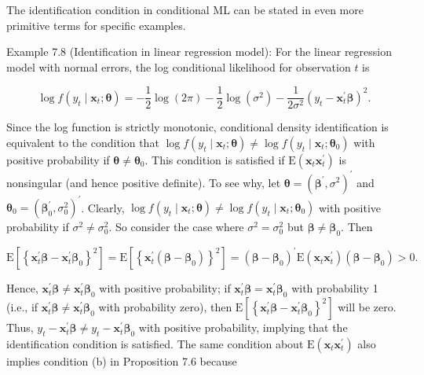 \documentclass[10pt]{article}
\begin{document}
The identification condition in conditional ML can be stated in even more primitive terms for specific examples.

Example 7.8 (Identification in linear regression model): For the linear regression model with normal errors, the log conditional likelihood for observation $t$ is

$$
\log f\left(y_{t} \mid \mathbf{x}_{t} ; \boldsymbol{\theta}\right)=-\frac{1}{2} \log (2 \pi)-\frac{1}{2} \log \left(\sigma^{2}\right)-\frac{1}{2 \sigma^{2}}\left(y_{t}-\mathbf{x}_{t}^{\prime} \boldsymbol{\beta}\right)^{2} .
$$

Since the log function is strictly monotonic, conditional density identification is equivalent to the condition that $\log f\left(y_{t} \mid \mathbf{x}_{t} ; \boldsymbol{\theta}\right) \neq \log f\left(y_{t} \mid \mathbf{x}_{t} ; \boldsymbol{\theta}_{0}\right)$ with positive probability if $\boldsymbol{\theta} \neq \boldsymbol{\theta}_{0}$. This condition is satisfied if $\mathrm{E}\left(\mathbf{x}_{t} \mathbf{x}_{t}^{\prime}\right)$ is nonsingular (and hence positive definite). To see why, let $\boldsymbol{\theta}=\left(\boldsymbol{\beta}^{\prime}, \sigma^{2}\right)^{\prime}$ and $\boldsymbol{\theta}_{0}=\left(\boldsymbol{\beta}_{0}^{\prime}, \sigma_{0}^{2}\right)^{\prime}$. Clearly, $\log f\left(y_{t} \mid \mathbf{x}_{t} ; \boldsymbol{\theta}\right) \neq \log f\left(y_{t} \mid \mathbf{x}_{t} ; \boldsymbol{\theta}_{0}\right)$ with positive probability if $\sigma^{2} \neq \sigma_{0}^{2}$. So consider the case where $\sigma^{2}=\sigma_{0}^{2}$ but $\boldsymbol{\beta} \neq \boldsymbol{\beta}_{0}$. Then

$$
\mathrm{E}\left[\left\{\mathbf{x}_{t}^{\prime} \boldsymbol{\beta}-\mathbf{x}_{t}^{\prime} \boldsymbol{\beta}_{0}\right\}^{2}\right]=\mathrm{E}\left[\left\{\mathbf{x}_{t}^{\prime}\left(\boldsymbol{\beta}-\boldsymbol{\beta}_{0}\right)\right\}^{2}\right]=\left(\boldsymbol{\beta}-\boldsymbol{\beta}_{0}\right)^{\prime} \mathrm{E}\left(\mathbf{x}_{t} \mathbf{x}_{t}^{\prime}\right)\left(\boldsymbol{\beta}-\boldsymbol{\beta}_{0}\right)>0 .
$$

Hence, $\mathbf{x}_{t}^{\prime} \boldsymbol{\beta} \neq \mathbf{x}_{t}^{\prime} \boldsymbol{\beta}_{0}$ with positive probability; if $\mathbf{x}_{t}^{\prime} \boldsymbol{\beta}=\mathbf{x}_{t}^{\prime} \boldsymbol{\beta}_{0}$ with probability 1 (i.e., if $\mathbf{x}_{t}^{\prime} \boldsymbol{\beta} \neq \mathbf{x}_{t}^{\prime} \boldsymbol{\beta}_{0}$ with probability zero), then $\mathrm{E}\left[\left\{\mathbf{x}_{t}^{\prime} \boldsymbol{\beta}-\mathbf{x}_{t}^{\prime} \boldsymbol{\beta}_{0}\right\}^{2}\right]$ will be zero. Thus, $y_{t}-\mathbf{x}_{t}^{\prime} \boldsymbol{\beta} \neq y_{t}-\mathbf{x}_{t}^{\prime} \boldsymbol{\beta}_{0}$ with positive probability, implying that the identification condition is satisfied. The same condition about $\mathrm{E}\left(\mathbf{x}_{t} \mathbf{x}_{t}^{\prime}\right)$ also implies condition (b) in Proposition 7.6 because
\end{document}
